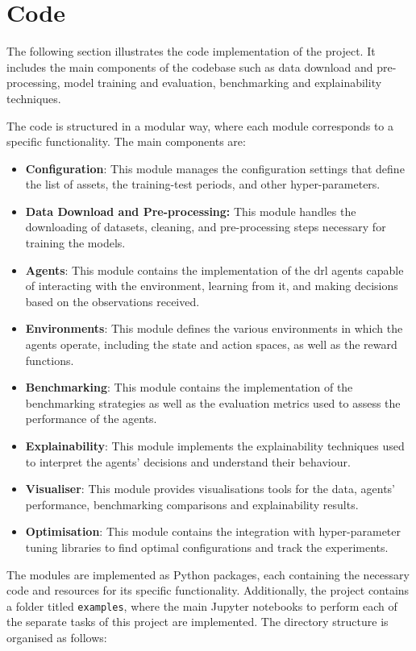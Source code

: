 \chapter{Code} \label{app:code}

The following section illustrates the code implementation of the project. It includes the main components of the codebase such as data download and pre-processing, model training and evaluation, benchmarking and explainability techniques. 

The code is structured in a modular way, where each module corresponds to a specific functionality. The main components are:
\begin{itemize}
    \item \textbf{Configuration}: This module manages the configuration settings that define the list of assets, the training-test periods, and other hyper-parameters.
    \item \textbf{Data Download and Pre-processing:} This module handles the downloading of datasets, cleaning, and pre-processing steps necessary for training the models.
    \item \textbf{Agents}: This module contains the implementation of the \acrshort{drl} agents capable of interacting with the environment, learning from it, and making decisions based on the observations received.
    \item \textbf{Environments}: This module defines the various environments in which the agents operate, including the state and action spaces, as well as the reward functions.
    \item \textbf{Benchmarking}: This module contains the implementation of the benchmarking strategies as well as the evaluation metrics used to assess the performance of the agents.
    \item \textbf{Explainability}: This module implements the explainability techniques used to interpret the agents' decisions and understand their behaviour.
    \item \textbf{Visualiser}: This module provides visualisations tools for the data, agents' performance, benchmarking comparisons and explainability results.
    \item \textbf{Optimisation}: This module contains the integration with hyper-parameter tuning libraries to find optimal configurations and track the experiments.
\end{itemize}

The modules are implemented as Python packages, each containing the necessary code and resources for its specific functionality. Additionally, the project contains a folder titled \texttt{examples}, where the main Jupyter notebooks to perform each of the separate tasks of this project are implemented. The directory structure is organised as follows:

